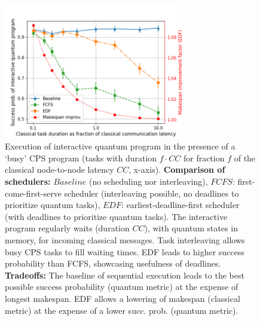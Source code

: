 \begin{figure}
    \centering
    \includegraphics[width=0.7\textwidth]{figures/qoala/tradeoffs_cq.png}
    \caption{Execution of interactive quantum program in the presence of a `busy' CPS program (tasks with duration $f \cdot CC$ for fraction $f$ of the classical node-to-node latency $CC$, x-axis).
    \textbf{Comparison of schedulers:}
    $Baseline$ (no scheduling nor interleaving),
    $FCFS$: first-come-first-serve scheduler (interleaving possible, no deadlines to prioritize quantum tasks),
    $EDF$: earliest-deadline-first scheduler (with deadlines to prioritize quantum tasks).
    The interactive program regularly waits (duration $CC$), with quantum states in memory, for incoming classical messages. %
    Task interleaving allows busy CPS tasks to fill waiting times.
    EDF leads to higher success probability than FCFS, showcasing usefulness of deadlines.
    \textbf{Tradeoffs:}
    The baseline of sequential execution leads to the best possible success probability (quantum metric) at the expense of longest makespan. EDF allows a lowering of makespan (classical metric) at the expense of a lower succ. prob. (quantum metric). 
    }
    \label{qoala:fig:eval_tradeoffs_cq}
\end{figure}

